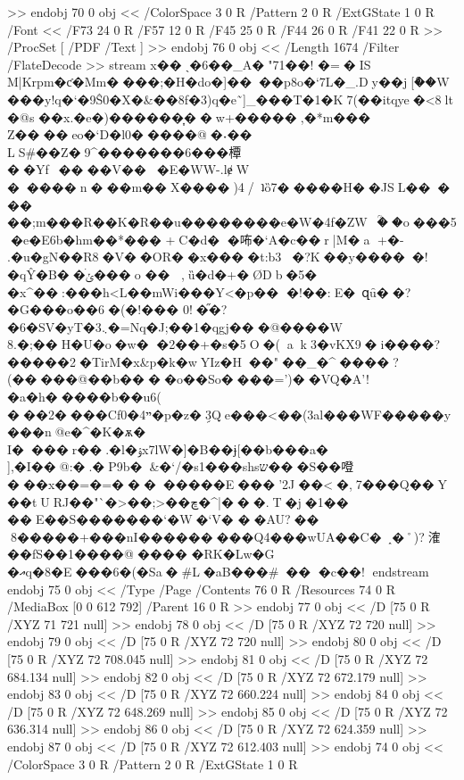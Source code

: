 {{{{{{{>>
endobj
70 0 obj
<<
 /ColorSpace 3 0 R /Pattern 2 0 R /ExtGState 1 0 R 
/Font << /F73 24 0 R /F57 12 0 R /F45 25 0 R /F44 26 0 R /F41 22 0 R >>
/ProcSet [ /PDF /Text ]
>>
endobj
76 0 obj
<<
/Length 1674      
/Filter /FlateDecode
>>
stream
x��ˎ�6��_A�"71��!	�=�IS M|Krpm�ƈ�Mm����;�H�do\+�]����p8o�`7L�_.Dy��j[ް��W���y!q�`�9Ŝ0�X�&��8f�3)q�e˜]_���T�1�K7(��itqye�<8lt�@s
��x.�e�){������͎��w+�����,� *m���	Z����eo�`D�l0�����@�˖��	LS\6#��Z�9^�������6���橝��Yf~����V���E�WW-.lɇ\;W	�����n���m��X����)4/ʇȍ7�����H��}JSL�����
��;m���R��K�R��u��������e�W�4f �ZW~ؒ��o���5�e�E6b�hm��*���
+C�d�	�咘�`A�c��r|M�a	+�-
.�u�gN��R8�V��OR�{᫙�x����t:b3�?K��y�����!� qŶ�B��ׄݵ���o	��
,ȕ�d�+�ØDb�5�%
�x^��:���h<L��mWi���Y<�p��
�!��:E�~զȗ��?�G���o��6�(�!��� 0!�֞�?�6�SV�yT�܆3�=Nq�J;��1�qgj���@����W 8.�;��H�U�o�w�	�2��+�s�5O�(ak3�vKX9�i����?�����2 �TirM�x&p�k�wYIz�H��"��_�^����}?(�����@��b����o��So�򸋒���=')��VQ�A'!�a�h�����b��u6(%
���2����Cf0�ײ4�p�z�ܹ3Qe���<��(3al���WF�����y��{�n@e�^�K�ѫ� I����r��.�l�ۉx7lW�]�B��ɉ[��b���a� ],�I��@:�.�P9b�&�`/�s1���shsש���S��噔���x��=�=��������E���'2J��<�,7���Q��Y��tURJ��"`�>��;>��ڇ�^|���.T�j�1�� ��E��S�������`�W�`V�	��AU?��%
8�����+���nI������}���Q4���wUA��C�~˰�˚)?㴶��fS��1����@���� �RK�Lw�G	�އq�8�E��}�6�(�Sa�#L�aB���#��
�c��!%
endstream
endobj
75 0 obj
<<
/Type /Page
/Contents 76 0 R
/Resources 74 0 R
/MediaBox [0 0 612 792]
/Parent 16 0 R
>>
endobj
77 0 obj
<<
/D [75 0 R /XYZ 71 721 null]
>>
endobj
78 0 obj
<<
/D [75 0 R /XYZ 72 720 null]
>>
endobj
79 0 obj
<<
/D [75 0 R /XYZ 72 720 null]
>>
endobj
80 0 obj
<<
/D [75 0 R /XYZ 72 708.045 null]
>>
endobj
81 0 obj
<<
/D [75 0 R /XYZ 72 684.134 null]
>>
endobj
82 0 obj
<<
/D [75 0 R /XYZ 72 672.179 null]
>>
endobj
83 0 obj
<<
/D [75 0 R /XYZ 72 660.224 null]
>>
endobj
84 0 obj
<<
/D [75 0 R /XYZ 72 648.269 null]
>>
endobj
85 0 obj
<<
/D [75 0 R /XYZ 72 636.314 null]
>>
endobj
86 0 obj
<<
/D [75 0 R /XYZ 72 624.359 null]
>>
endobj
87 0 obj
<<
/D [75 0 R /XYZ 72 612.403 null]
>>
endobj
74 0 obj
<<
 /ColorSpace 3 0 R /Pattern 2 0 R /ExtGState 1 0 R 
}}}}}}
